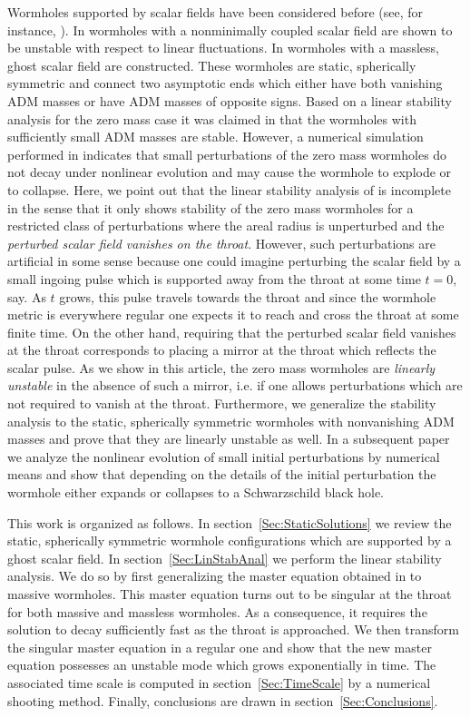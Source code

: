 \documentclass[           %
               showpacs,            %
               preprintnumbers,     %
               aps,                 %
               prd,                 %
               superscriptaddress,      %
               nofootinbib,         %
               tightenlines,        %
               floats,floatfix      %
               ]{revtex4}
\begin{document}
Wormholes supported by scalar fields have been considered before (see,
for instance,
\cite{kBsG02,kBsG04,kBaS07,cA02,hSsH02,sSsK04,tMdN06,eDtZ07}). In
\cite{kBsG02,kBsG04,kBaS07} wormholes with a nonminimally coupled
scalar field are shown to be unstable with respect to linear
fluctuations. In \cite{cA02} wormholes with a massless, ghost scalar
field are constructed. These wormholes are static, spherically
symmetric and connect two asymptotic ends which either have both
vanishing ADM masses or have ADM masses of opposite signs. Based on a
linear stability analysis for the zero mass case it was claimed in
\cite{cA02} that the wormholes with sufficiently small ADM masses are
stable. However, a numerical simulation performed in \cite{hSsH02}
indicates that small perturbations of the zero mass wormholes do not
decay under nonlinear evolution and may cause the wormhole to explode
or to collapse. Here, we point out that the linear stability analysis
of \cite{cA02} is incomplete in the sense that it only shows stability
of the zero mass wormholes for a restricted class of perturbations
where the areal radius is unperturbed and the {\em perturbed scalar
field vanishes on the throat}. However, such perturbations are
artificial in some sense because one could imagine perturbing the
scalar field by a small ingoing pulse which is supported away from the
throat at some time $t=0$, say. As $t$ grows, this pulse travels
towards the throat and since the wormhole metric is everywhere regular
one expects it to reach and cross the throat at some finite time. On
the other hand, requiring that the perturbed scalar field vanishes at
the throat corresponds to placing a mirror at the throat which
reflects the scalar pulse. As we show in this article, the zero mass
wormholes are {\em linearly unstable} in the absence of such a mirror,
i.e. if one allows perturbations which are not required to vanish at
the throat. Furthermore, we generalize the stability analysis to the
static, spherically symmetric wormholes with nonvanishing ADM masses
and prove that they are linearly unstable as well. In a subsequent
paper we analyze the nonlinear evolution of small initial
perturbations by numerical means and show that depending on the
details of the initial perturbation the wormhole either expands or
collapses to a Schwarzschild black hole.

This work is organized as follows. In
section~\ref{Sec:StaticSolutions} we review the static, spherically
symmetric wormhole configurations which are supported by a ghost
scalar field. In section~\ref{Sec:LinStabAnal} we perform the linear
stability analysis. We do so by first generalizing the master equation
obtained in \cite{cA02} to massive wormholes. This master equation
turns out to be singular at the throat for both massive and massless
wormholes. As a consequence, it requires the solution to decay
sufficiently fast as the throat is approached. We then transform the
singular master equation in a regular one and show that the new master
equation possesses an unstable mode which grows exponentially in
time. The associated time scale is computed in
section~\ref{Sec:TimeScale} by a numerical shooting method. Finally,
conclusions are drawn in section~\ref{Sec:Conclusions}.
\end{document}
